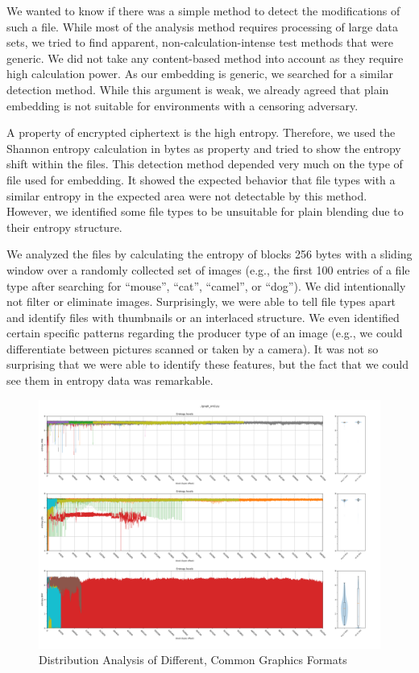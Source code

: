 We wanted to know if there was a simple method to detect the modifications of such a file. While most of the analysis method requires processing of large data sets, we tried to find apparent, non-calculation-intense test methods that were generic. We did not take any content-based method into account as they require high calculation power. As our embedding is generic, we searched for a similar detection method. While this argument is weak, we already agreed that plain embedding is not suitable for environments with a censoring adversary.

A property of encrypted ciphertext is the high entropy. Therefore, we used the Shannon entropy calculation in bytes as property and tried to show the entropy shift within the files. This detection method depended very much on the type of file used for embedding. It showed the expected behavior that file types with a similar entropy in the expected area were not detectable by this method. However, we identified some file types to be unsuitable for plain blending due to their entropy structure.

We analyzed the files by calculating the entropy of blocks 256 bytes with a sliding window over a randomly collected set of images (e.g., the first 100 entries of a file type after searching for ``mouse'', ``cat'', ``camel'', or ``dog''). We did intentionally not filter or eliminate images. Surprisingly, we were able to tell file types apart and identify files with thumbnails or an interlaced structure. We even identified certain specific patterns regarding the producer type of an image (e.g., we could differentiate between pictures scanned or taken by a camera). It was not so surprising that we were able to identify these features, but the fact that we could see them in entropy data was remarkable.

\begin{figure}[ht]
	\includegraphics[width=\textwidth]{inc/statanalysis_graph}
	\caption{Distribution Analysis of Different, Common Graphics Formats}
	\label{fig:statGraph}
\end{figure}

